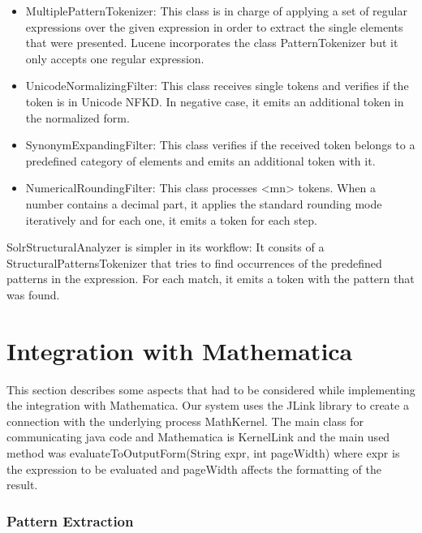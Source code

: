 \begin{itemize}
\item {\codefont MultiplePatternTokenizer}: This class is in charge of applying a set of regular expressions over the given expression in order to extract the single elements that were presented. Lucene incorporates the class {\codefont PatternTokenizer} but it only accepts one regular expression.
\item {\codefont UnicodeNormalizingFilter}: This class receives single tokens and verifies if the token is in Unicode NFKD. In negative case, it emits an additional token in the normalized form.
\item {\codefont SynonymExpandingFilter}: This class verifies if the received token belongs to a predefined category of elements and emits an additional token with it.
\item {\codefont NumericalRoundingFilter}: This class processes {\codefont <mn>} tokens. When a number contains a decimal part, it applies the standard rounding mode iteratively and for each one, it emits a token for each step. 
\end{itemize}

{\codefont SolrStructuralAnalyzer } is simpler in its workflow: It consits of a {\codefont StructuralPatternsTokenizer} that tries to find occurrences of the predefined patterns in the expression. For each match, it emits a token with the pattern that was found. 

\section{Integration with Mathematica}
This section describes some aspects that had to be considered while implementing the integration with Mathematica. Our system uses the {\codefont JLink} library to create a connection with the underlying process {\codefont MathKernel}. The main class for communicating java code and {\codefont Mathematica} is {\codefont KernelLink} and the main used method was {\codefont evaluateToOutputForm(String expr, int pageWidth)} where {\codefont expr} is the expression to be evaluated and {\codefont pageWidth} affects the formatting of the result.

\subsubsection{Pattern Extraction}

